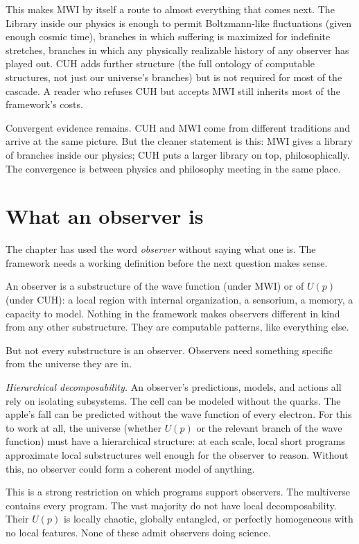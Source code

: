 This makes MWI by itself a route to almost everything that comes next. The Library inside our physics is enough to permit Boltzmann-like fluctuations (given enough cosmic time), branches in which suffering is maximized for indefinite stretches, branches in which any physically realizable history of any observer has played out. CUH adds further structure (the full ontology of computable structures, not just our universe's branches) but is not required for most of the cascade. A reader who refuses CUH but accepts MWI still inherits most of the framework's costs.

Convergent evidence remains. CUH and MWI come from different traditions and arrive at the same picture. But the cleaner statement is this: MWI gives a library of branches inside our physics; CUH puts a larger library on top, philosophically. The convergence is between physics and philosophy meeting in the same place.

\section*{What an observer is}

The chapter has used the word \emph{observer} without saying what one is. The framework needs a working definition before the next question makes sense.

An observer is a substructure of the wave function (under MWI) or of $U(p)$ (under CUH): a local region with internal organization, a sensorium, a memory, a capacity to model. Nothing in the framework makes observers different in kind from any other substructure. They are computable patterns, like everything else.

But not every substructure is an observer. Observers need something specific from the universe they are in.

\emph{Hierarchical decomposability.} An observer's predictions, models, and actions all rely on isolating subsystems. The cell can be modeled without the quarks. The apple's fall can be predicted without the wave function of every electron. For this to work at all, the universe (whether $U(p)$ or the relevant branch of the wave function) must have a hierarchical structure: at each scale, local short programs approximate local substructures well enough for the observer to reason. Without this, no observer could form a coherent model of anything.

This is a strong restriction on which programs support observers. The multiverse contains every program. The vast majority do not have local decomposability. Their $U(p)$ is locally chaotic, globally entangled, or perfectly homogeneous with no local features. None of these admit observers doing science.

